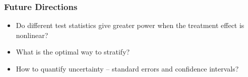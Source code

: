 \documentclass{beamer}
\begin{document}
\frame
{
  \frametitle{Future Directions}
\begin{center}
\begin{itemize}
\item Do different test statistics give greater power when the treatment effect is nonlinear?
\item What is the optimal way to stratify?
\item How to quantify uncertainty -- standard errors and confidence intervals?
\end{itemize}
\end{center}
}



%
%
%
\end{document}
